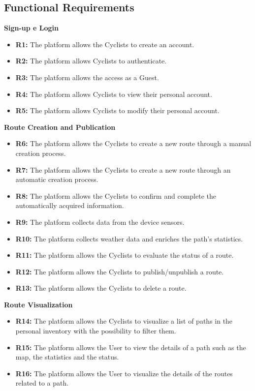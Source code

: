 \subsection{Functional Requirements}
\textbf{Sign-up e Login}
\begin{itemize}
    \item \textbf{R1:} The platform allows the Cyclists to create an account.
    \item \textbf{R2:} The platform allows Cyclists to authenticate.
    \item \textbf{R3:} The platform allows the access as a Guest. 
    \item \textbf{R4:} The platform allows Cyclists to view their personal account.
    \item \textbf{R5:} The platform allows Cyclists to modify their personal account.
\end{itemize}
\textbf{Route Creation and Publication}
\begin{itemize}
    \item \textbf{R6:} The platform allows the Cyclists to create a new route through a manual creation process.
    \item \textbf{R7:} The platform allows the Cyclists to create a new route through an automatic creation process.
    \item \textbf{R8:} The platform allows the Cyclists to confirm and complete the automatically acquired information.
    \item \textbf{R9:} The platform collects data from the device sensors.
    \item \textbf{R10:} The platform collects weather data and enriches the path's statistics.
    \item \textbf{R11:} The platform allows the Cyclists to evaluate the status of a route. 
    \item \textbf{R12:} The platform allows the Cyclists to publish/unpublish a route.
    \item \textbf{R13:} The platform allows the Cyclists to delete a route.
\end{itemize}
\bigskip\bigskip
\textbf{Route Visualization}
\begin{itemize}
    \item \textbf{R14:} The platform allows the Cyclists to visualize a list of paths in the personal inventory with the possibility to filter them.
    \item \textbf{R15:} The platform allows the User to view the details of a path such as the map, the statistics and the status.
    \item \textbf{R16:} The platform allows the User to visualize the details of the routes related to a path.
\end{itemize}
